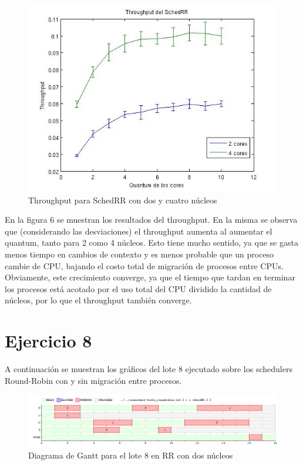 \documentclass{article}
\begin{document}
  \begin{figure}
  \includegraphics[scale=0.6]{TH.jpg}
  \caption{Throughput para SchedRR con dos y cuatro n\'ucleos}
  \end{figure}
  
  En la figura 6 se muestran los resultados del throughput. En la misma se observa que (considerando las desviaciones) el throughput aumenta al aumentar el quantum, tanto para 2 como 4 n\'ucleos. Esto tiene mucho sentido, ya que se
  gasta menos tiempo en cambios de contexto y es menos probable que un proceso cambie de CPU, bajando el costo total de migraci\'on de procesos entre CPUs. Obviamente, este crecimiento converge, ya que el tiempo que tardan en terminar los procesos est\'a acotado por
  el uso total del CPU dividido la cantidad de n\'ucleos, por lo que el throughput tambi\'en converge.
  
  \section{Ejercicio 8}
  
  A continuaci\'on se muestran los gr\'aficos del lote 8 ejecutado sobre los schedulers Round-Robin con y sin migraci\'on entre procesos.
  
  \begin{figure}
  \includegraphics[scale=0.32]{ej8_RR.png}
  \caption{Diagrama de Gantt para el lote 8 en RR con dos n\'ucleos}
  \end{figure}
  
\end{document}

